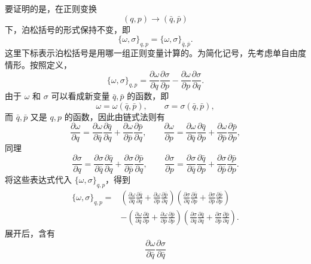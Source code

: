 \begin{solution}[泊松括号不变性]
\answer
要证明的是，在正则变换
\[
(q,p)\longrightarrow (\bar q,\bar p)
\]
下，泊松括号的形式保持不变，即
\[
\{\omega,\sigma\}_{q,p}=\{\omega,\sigma\}_{\bar q,\bar p}.
\]
这里下标表示泊松括号是用哪一组正则变量计算的。为简化记号，先考虑单自由度情形。按照定义，
\[
\{\omega,\sigma\}_{q,p}
=
\frac{\partial \omega}{\partial q}\frac{\partial \sigma}{\partial p}
-
\frac{\partial \omega}{\partial p}\frac{\partial \sigma}{\partial q}.
\]
由于 \(\omega\) 和 \(\sigma\) 可以看成新变量 \(\bar q,\bar p\) 的函数，即
\[
\omega=\omega(\bar q,\bar p),\qquad \sigma=\sigma(\bar q,\bar p),
\]
而 \(\bar q,\bar p\) 又是 \(q,p\) 的函数，因此由链式法则有
\[
\frac{\partial \omega}{\partial q}
=
\frac{\partial \omega}{\partial \bar q}\frac{\partial \bar q}{\partial q}
+
\frac{\partial \omega}{\partial \bar p}\frac{\partial \bar p}{\partial q},
\qquad
\frac{\partial \omega}{\partial p}
=
\frac{\partial \omega}{\partial \bar q}\frac{\partial \bar q}{\partial p}
+
\frac{\partial \omega}{\partial \bar p}\frac{\partial \bar p}{\partial p},
\]
同理
\[
\frac{\partial \sigma}{\partial q}
=
\frac{\partial \sigma}{\partial \bar q}\frac{\partial \bar q}{\partial q}
+
\frac{\partial \sigma}{\partial \bar p}\frac{\partial \bar p}{\partial q},
\qquad
\frac{\partial \sigma}{\partial p}
=
\frac{\partial \sigma}{\partial \bar q}\frac{\partial \bar q}{\partial p}
+
\frac{\partial \sigma}{\partial \bar p}\frac{\partial \bar p}{\partial p}.
\]
将这些表达式代入 \(\{\omega,\sigma\}_{q,p}\)，得到
\[
\begin{aligned}
\{\omega,\sigma\}_{q,p}
={}&
\left(
\frac{\partial \omega}{\partial \bar q}\frac{\partial \bar q}{\partial q}
+
\frac{\partial \omega}{\partial \bar p}\frac{\partial \bar p}{\partial q}
\right)
\left(
\frac{\partial \sigma}{\partial \bar q}\frac{\partial \bar q}{\partial p}
+
\frac{\partial \sigma}{\partial \bar p}\frac{\partial \bar p}{\partial p}
\right)\\
&-
\left(
\frac{\partial \omega}{\partial \bar q}\frac{\partial \bar q}{\partial p}
+
\frac{\partial \omega}{\partial \bar p}\frac{\partial \bar p}{\partial p}
\right)
\left(
\frac{\partial \sigma}{\partial \bar q}\frac{\partial \bar q}{\partial q}
+
\frac{\partial \sigma}{\partial \bar p}\frac{\partial \bar p}{\partial q}
\right).
\end{aligned}
\]
展开后，含有
\[
\frac{\partial \omega}{\partial \bar q}
\frac{\partial \sigma}{\partial \bar q}
\]
\end{solution}
